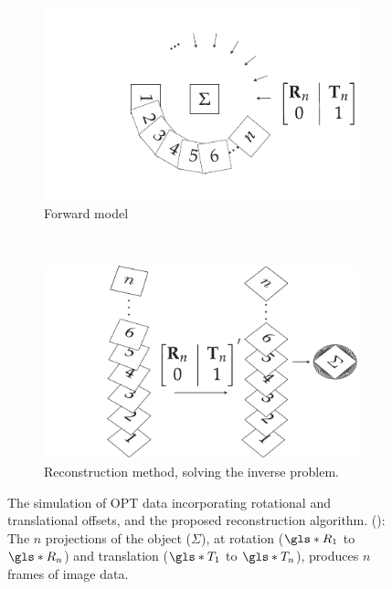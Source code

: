 \documentclass{osa-article}
\begin{document}
\begin{figure}
  \centering
  \begin{subfigure}[t]{\linewidth}
    \centering
    \includegraphics{./figures/flopt_algorithm_forward}
    \caption{Forward model}\label{fig:flopt_algorithm_forward}
  \end{subfigure}
  \\\vspace{\abovecaptionskip}
  \begin{subfigure}[t]{\linewidth}
    \centering
    \includegraphics{./figures/flopt_algorithm}
    \caption{Reconstruction method, solving the inverse problem.}\label{fig:flopt_algorithm_inverse}
  \end{subfigure}
  \caption[Simulation of OPT data incorporating rotational and translational offsets, and the proposed reconstruction algorithm]{
    The simulation of OPT data incorporating rotational and translational offsets, and the proposed reconstruction algorithm.
    (): The \(n\) projections of the object (\(\Sigma \)), at rotation (\(\gls*{R}_1\) to \(\gls*{R}_n\)) and translation (\(\gls*{T}_1\) to \(\gls*{T}_n\)), produces \(n\) frames of image data.
}
\end{figure}
\end{document}
